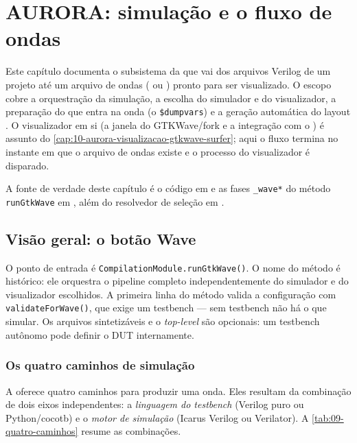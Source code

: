 \chapter{AURORA: simulação e o fluxo de ondas}
\label{cap:09-aurora-simulacao-ondas}

Este capítulo documenta o subsistema da  que vai dos arquivos
Verilog de um projeto até um arquivo de ondas ( ou )
pronto para ser visualizado. O escopo cobre a orquestração da simulação, a
escolha do simulador e do visualizador, a preparação do que entra na onda
(o \lstinline|$dumpvars|) e a geração automática do layout . O
visualizador em si (a janela do GTKWave/fork  e a integração com
o ) é assunto do \autoref{cap:10-aurora-visualizacao-gtkwave-surfer}; aqui o fluxo
termina no instante em que o arquivo de ondas existe e o processo do
visualizador é disparado.

A fonte de verdade deste capítulo é o código em  e as fases
\lstinline|_wave*| do método \lstinline|runGtkWave| em
, além do resolvedor de seleção em
.

\section{Visão geral: o botão Wave}

O ponto de entrada é \lstinline|CompilationModule.runGtkWave()|. O nome do
método é histórico: ele orquestra o pipeline completo independentemente do
simulador e do visualizador escolhidos. A primeira linha do método valida a
configuração com \lstinline|validateForWave()|, que exige um testbench --- sem
testbench não há o que simular. Os arquivos sintetizáveis e o \emph{top-level}
são opcionais: um testbench autônomo pode definir o DUT internamente.

\subsection{Os quatro caminhos de simulação}

A  oferece quatro caminhos para produzir uma onda. Eles resultam da
combinação de dois eixos independentes: a \emph{linguagem do testbench}
(Verilog puro ou Python/cocotb) e o \emph{motor de simulação} (Icarus Verilog ou
Verilator). A \autoref{tab:09-quatro-caminhos} resume as combinações.

